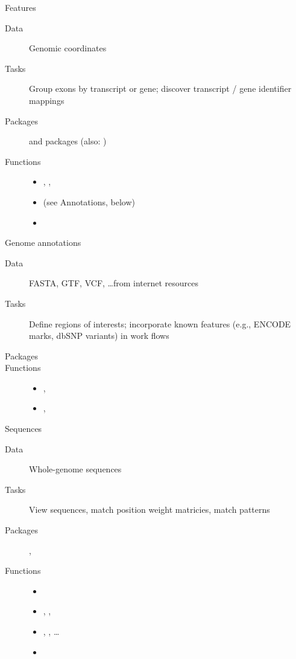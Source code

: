 \documentclass[xcolor=dvipsnames]{beamer}\usepackage[]{graphicx}\usepackage[]{color}
\begin{document}
\begin{frame}{Features}
  \begin{description}
  \item[Data] Genomic coordinates
  \item[Tasks] Group exons by transcript or gene; discover transcript
    / gene identifier mappings
  \item[Packages]  and 
    packages (also: )
  \item[Functions]
    \begin{itemize}
    \item {}, , 
    \item {} (see Annotations, below)
    \item {}
    \end{itemize}
  \end{description}
\end{frame}

\begin{frame}{Genome annotations}
  \begin{description}
  \item[Data] FASTA, GTF, VCF, \ldots from internet resources
  \item[Tasks] Define regions of interests; incorporate known features
    (e.g., ENCODE marks, dbSNP variants) in work flows
  \item[Packages] 
  \item[Functions]
    \begin{itemize}
    \item {}, 
    \item {}, 
    \end{itemize}
  \end{description}
\end{frame}

\begin{frame}{Sequences}
  \begin{description}
  \item[Data] Whole-genome sequences
  \item[Tasks] View sequences, match position weight matricies, match
    patterns
  \item[Packages] , 
  \item[Functions]
    \begin{itemize}
    \item {}
    \item {}, , 
    \item {}, , \ldots
    \item {}
    \end{itemize}
  \end{description}
\end{frame}
\end{document}
